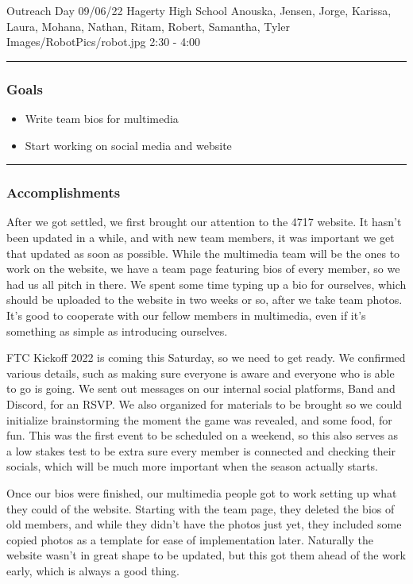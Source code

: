 \insertmeeting 
	{Outreach Day} 
	{09/06/22}
	{Hagerty High School}
	{Anouska, Jensen, Jorge, Karissa, Laura, Mohana, Nathan, Ritam, Robert, Samantha, Tyler}
	{Images/RobotPics/robot.jpg}
	{2:30 - 4:00}
	
\noindent\hfil\rule{\textwidth}{.4pt}\hfil
\subsubsection*{Goals}
\begin{itemize}
    \item Write team bios for multimedia
    \item Start working on social media and website

\end{itemize} 

\noindent\hfil\rule{\textwidth}{.4pt}\hfil

\subsubsection*{Accomplishments}
After we got settled, we first brought our attention to the 4717 website. It hasn't been updated in a while, and with new team members, it was important we get that updated as soon as possible. While the multimedia team will be the ones to work on the website, we have a team page featuring bios of every member, so we had us all pitch in there. We spent some time typing up a bio for ourselves, which should be uploaded to the website in two weeks or so, after we take team photos. It's good to cooperate with our fellow members in multimedia, even if it's something as simple as introducing ourselves.

FTC Kickoff 2022 is coming this Saturday, so we need to get ready. We confirmed various details, such as making sure everyone is aware and everyone who is able to go is going. We sent out messages on our internal social platforms, Band and Discord, for an RSVP. We also organized for materials to be brought so we could initialize brainstorming the moment the game was revealed, and some food, for fun. This was the first event to be scheduled on a weekend, so this also serves as a low stakes test to be extra sure every member is connected and checking their socials, which will be much more important when the season actually starts.

Once our bios were finished, our multimedia people got to work setting up what they could of the website. Starting with the team page, they deleted the bios of old members, and while they didn't have the photos just yet, they included some copied photos as a template for ease of implementation later. Naturally the website wasn't in great shape to be updated, but this got them ahead of the work early, which is always a good thing.

